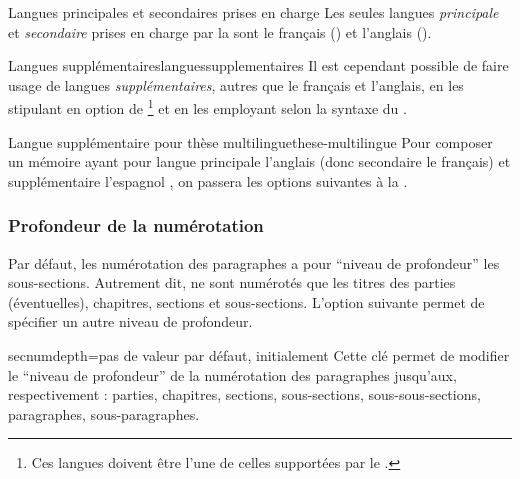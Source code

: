 \begin{dbwarning}{Langues principales et secondaires prises en charge}{}
  Les seules langues \emph{principale} et \emph{secondaire} prises en charge
  par la \yatcl sont le français () et l'anglais
  ().
\end{dbwarning}

\begin{dbremark}{Langues supplémentaires}{languessupplementaires}
  Il est cependant possible de faire usage de langues \emph{supplémentaires},
  autres que le français et l'anglais, en les stipulant en option de
  \footnote{Ces langues doivent être l'une de
    celles supportées par le .} et en les employant selon la
  syntaxe du .
\end{dbremark}

\begin{dbexample}{Langue supplémentaire pour thèse
    multilingue}{these-multilingue}
  Pour composer un mémoire ayant pour langue principale l'anglais (donc
  secondaire le français) et supplémentaire l'espagnol , on passera les options suivantes
  à la \yatcl{}.
\end{dbexample}

\subsubsection{Profondeur de la numérotation}\label{sec:profondeur-de-la}

Par défaut, les numérotation des paragraphes a pour \enquote{niveau de
  profondeur} les sous-sections. Autrement dit, ne sont numérotés que les
titres des parties (éventuelles), chapitres, sections et sous-sections.
L'option  suivante permet de spécifier un autre niveau de
profondeur.
%
{%
  \begin{docKey}{secnumdepth}{=\textbar{}\textbar{}\textbar{}\textbar{}\textbar{}\textbar{}}{pas
      de valeur par défaut, initialement }
    Cette clé permet de modifier le \enquote{niveau de profondeur} de la
    numérotation des paragraphes jusqu'aux, respectivement : parties,
    chapitres, sections, sous-sections, sous-sous-sections, paragraphes,
    sous-paragraphes.
  \end{docKey}
}

